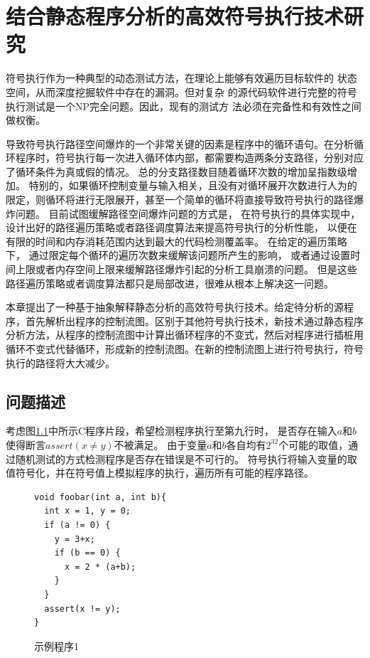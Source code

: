 
\chapter{结合静态程序分析的高效符号执行技术研究}
\label{chap-4}
符号执行作为一种典型的动态测试方法，在理论上能够有效遍历目标软件的
状态空间，从而深度挖掘软件中存在的漏洞。但对复杂
的源代码软件进行完整的符号执行测试是一个NP完全问题。因此，现有的测试方
法必须在完备性和有效性之间做权衡。%

导致符号执行路径空间爆炸的一个非常关键的因素是程序中的循环语句。在分析循环程序时，符号执行每一次进入循环体内部，都需要构造两条分支路径，分别对应了循环条件为真或假的情况。
总的分支路径数目随着循环次数的增加呈指数级增加。
特别的，如果循环控制变量与输入相关，且没有对循环展开次数进行人为的限定，则循环将进行无限展开，甚至一个简单的循环将直接导致符号执行的路径爆炸问题。
目前试图缓解路径空间爆炸问题的方式是，
在符号执行的具体实现中，设计出好的路径遍历策略或者路径调度算法来提高符号执行的分析性能，
以便在有限的时间和内存消耗范围内达到最大的代码检测覆盖率。
在给定的遍历策略下，
通过限定每个循环的遍历次数来缓解该问题所产生的影响，
或者通过设置时间上限或者内存空间上限来缓解路径爆炸引起的分析工具崩溃的问题。
但是这些路径遍历策略或者调度算法都只是局部改进，很难从根本上解决这一问题。

本章提出了一种基于抽象解释静态分析的高效符号执行技术。给定待分析的源程序，首先解析出程序的控制流图。区别于其他符号执行技术，新技术通过静态程序分析方法，从程序的控制流图中计算出循环程序的不变式，然后对程序进行插桩用循环不变式代替循环，形成新的控制流图。在新的控制流图上进行符号执行，符号执行的路径将大大减少。

\section{问题描述}

考虑图\ref{fig-example1}中所示C程序片段，希望检测程序执行至第九行时，
是否存在输入$a$和$b$使得断言$assert(x \neq y)$不被满足。
由于变量$a$和$b$各自均有$2^{32}$个可能的取值，通过随机测试的方式检测程序是否存在错误是不可行的。
符号执行将输入变量的取值符号化，并在符号值上模拟程序的执行，遍历所有可能的程序路径。

\begin{figure}[h]
\begin{lstlisting}
void foobar(int a, int b){
  int x = 1, y = 0;
  if (a != 0) {
    y = 3+x;
	if (b == 0) {
	  x = 2 * (a+b);
	}
  }
  assert(x != y);
}
\end{lstlisting}
\caption{示例程序1}
\label{fig-example1}
\end{figure}

